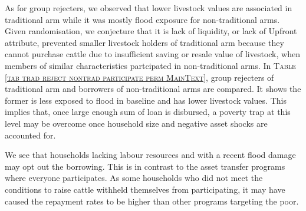 	As for group rejecters, we observed that lower livestock values are associated in \textsf{traditional} arm while it was mostly flood exposure for non-\textsf{traditional} arms. Given randomisation, we conjecture that it is lack of liquidity, or lack of \textsf{Upfront} attribute, prevented smaller livestock holders of \textsf{traditional} arm because they cannot purchase cattle due to insufficient saving or resale value of livestock, when members of similar characteristics partcipated in non-\textsf{traditional} arms. In \textsc{\normalsize Table \ref{tab trad reject nontrad participate perm MainText}}, group rejecters of \textsf{traditional} arm and borrowers of non-\textsf{traditional} arms are compared. It shows the former is less exposed to flood in baseline and has lower livestock values. This implies that, once large enough sum of loan is disbursed, %
a poverty trap at this level may be overcome once household size and negative asset shocks are accounted for.

	We see that households lacking labour resources and with a recent flood damage may opt out the borrowing. %
This is in contrast to the asset transfer programs where everyone participates. As some households who did not meet the conditions to raise cattle withheld themselves from participating, it may have caused the repayment rates to be higher than other programs targeting the poor. %

